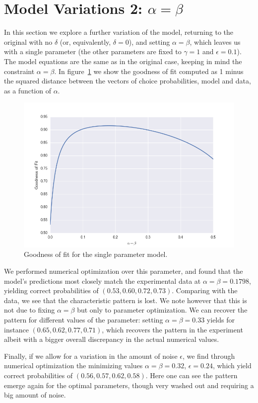 \documentclass[11pt, a4paper]{article}
\begin{document}
 
 
\section*{Model Variations 2: $\alpha=\beta$}
In this section we explore a further variation of the model, returning to the original with no $\delta$ (or, equivalently, $\delta=0$), and setting $\alpha=\beta$, which leaves us with a single parameter (the other parameters are fixed to $\gamma=1$ and $\epsilon=0.1$). The model equations are the same as in the original case, keeping in mind the constraint $\alpha=\beta$. In figure~\ref{fig:GoF1} we show the goodness of fit computed as 1 minus the squared distance between the vectors of choice probabilities, model and data, as a function of $\alpha$.
\begin{figure}[ht]
\centering
\includegraphics[width=12cm]{Figures/GoF_alpha.png}
\caption{Goodness of fit for the single parameter model.}
\label{fig:GoF1}
\end{figure} 

We performed numerical optimization over this parameter, and found that the model's predictions most closely match the experimental data at $\alpha=\beta=0.1798$, yielding correct probabilities of $(0.53, 0.60, 0.72, 0.73)$. Comparing with the data, we see that the characteristic pattern is lost. We note however that this is not due to fixing $\alpha=\beta$ but only to parameter optimization. We can recover the pattern for different values of the parameter: setting $\alpha=\beta=0.33$ yields for instance $(0.65, 0.62, 0.77, 0.71)$, which recovers the pattern in the experiment albeit with a bigger overall discrepancy in the actual numerical values. 

Finally, if we allow for a variation in the amount of noise $\epsilon$, we find through numerical optimization the minimizing values $\alpha=\beta=0.32$, $\epsilon=0.24$, which yield correct probabilities of $(0.56, 0.57, 0.62, 0.58)$. Here one can see the pattern emerge again for the optimal parameters, though very washed out and requiring a big amount of noise.  


 
\end{document}
